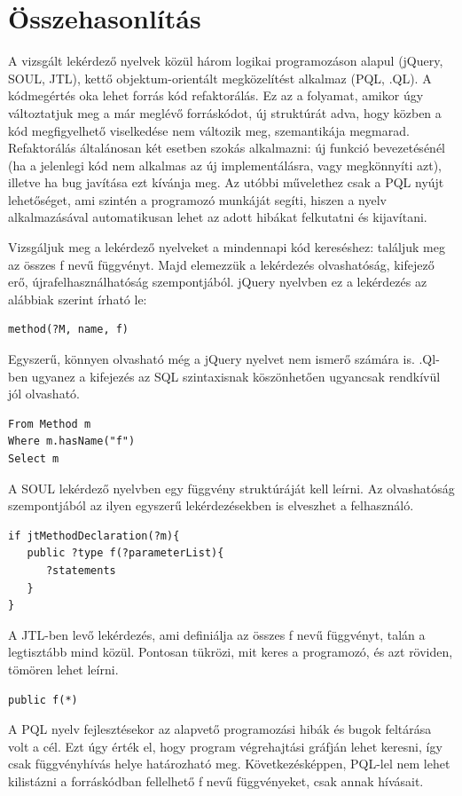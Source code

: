 \documentclass[a4paper,12pt]{report}
\begin{document}
\section{Összehasonlítás}
\par A vizsgált lekérdező nyelvek közül három logikai programozáson alapul (jQuery, SOUL, JTL), kettő objektum-orientált megközelítést alkalmaz (PQL, .QL). A kódmegértés oka lehet forrás kód refaktorálás. Ez az a folyamat, amikor úgy változtatjuk meg a már meglévő forráskódot, új struktúrát adva, hogy közben a kód megfigyelhető viselkedése nem változik meg, szemantikája megmarad. Refaktorálás általánosan két esetben szokás alkalmazni: új funkció bevezetésénél (ha a jelenlegi kód nem alkalmas az új implementálásra, vagy megkönnyíti azt), illetve ha bug javítása ezt kívánja meg. Az utóbbi művelethez csak a PQL nyújt lehetőséget, ami szintén a programozó munkáját segíti, hiszen a nyelv alkalmazásával automatikusan lehet az adott hibákat felkutatni és kijavítani.
\par Vizsgáljuk meg a lekérdező nyelveket a mindennapi kód kereséshez: találjuk meg az összes f nevű függvényt. Majd elemezzük a lekérdezés olvashatóság, kifejező erő, újrafelhasználhatóság szempontjából. 
jQuery nyelvben ez a lekérdezés az alábbiak szerint írható le:
\begin{verbatim}
method(?M, name, f)
\end{verbatim}
Egyszerű, könnyen olvasható még a jQuery nyelvet nem ismerő számára is.
.Ql-ben ugyanez a kifejezés az SQL szintaxisnak köszönhetően ugyancsak rendkívül jól olvasható.
\begin{verbatim}
From Method m
Where m.hasName("f")
Select m
\end{verbatim}
A SOUL lekérdező nyelvben egy függvény struktúráját kell leírni. Az olvashatóság szempontjából az ilyen egyszerű lekérdezésekben is elveszhet a felhasználó. 
\begin{verbatim}
if jtMethodDeclaration(?m){
   public ?type f(?parameterList){
      ?statements
   }
}
\end{verbatim}
A JTL-ben levő lekérdezés, ami definiálja az összes f nevű függvényt, talán a legtisztább mind közül. Pontosan tükrözi, mit keres a programozó, és azt röviden, tömören lehet leírni.
\begin{verbatim}
public f(*)
\end{verbatim}
A PQL nyelv fejlesztésekor az alapvető programozási hibák és bugok feltárása volt a cél. Ezt úgy érték el, hogy program végrehajtási gráfján lehet keresni, így csak függvényhívás helye határozható meg. Következésképpen, PQL-lel nem lehet kilistázni a forráskódban fellelhető f nevű függvényeket, csak annak hívásait.
\end{document}
